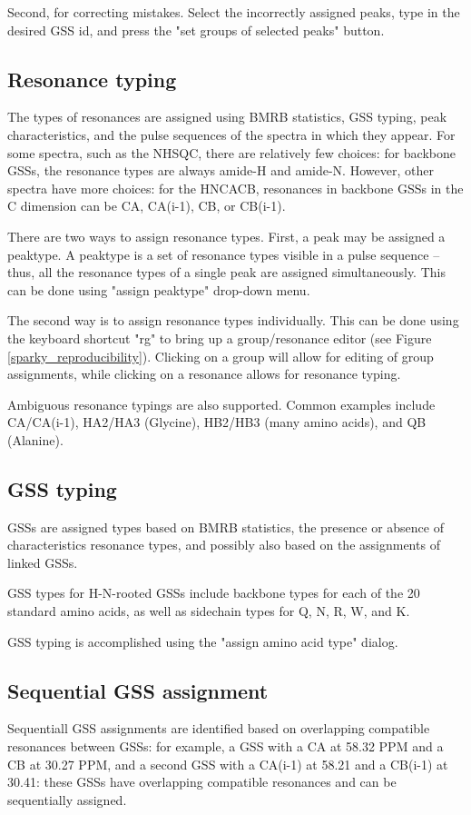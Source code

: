 Second, for correcting mistakes.  Select the incorrectly assigned peaks,
type in the desired GSS id, and press the "set groups of selected peaks" button.

\subsection{Resonance typing}
The types of resonances are assigned using BMRB statistics, GSS typing, 
peak characteristics,
and the pulse sequences of the spectra in which they appear.  For some spectra,
such as the NHSQC, there are relatively few choices: for backbone GSSs,
the resonance types are always amide-H and amide-N.  However, other spectra
have more choices: for the HNCACB, resonances in backbone GSSs in the C
dimension can be CA, CA(i-1), CB, or CB(i-1).

There are two ways to assign resonance types.  First, a peak may be assigned
a peaktype.  A peaktype is a set of resonance types visible in a pulse sequence
-- thus, all the resonance types of a single peak are assigned simultaneously.
This can be done using "assign peaktype" drop-down menu.

The second way is to assign resonance types individually.  This can be done 
using the keyboard shortcut "rg" to bring up a group/resonance editor
(see Figure \ref{sparky_reproducibility}).  Clicking on a group will allow
for editing of group assignments, while clicking on a resonance allows for
resonance typing.

Ambiguous resonance typings are also supported.  Common examples include
CA/CA(i-1), HA2/HA3 (Glycine), HB2/HB3 (many amino acids), and QB (Alanine).

\subsection{GSS typing}
GSSs are assigned types based on BMRB statistics, the presence or absence of
characteristics resonance types, and possibly also based on the assignments 
of linked GSSs.

GSS types for H-N-rooted GSSs include backbone types for each of the 20 
standard amino acids, as well as sidechain types for Q, N, R, W, and K.

GSS typing is accomplished using the "assign amino acid type" dialog.

\subsection{Sequential GSS assignment}
Sequentiall GSS assignments are identified based on overlapping compatible
resonances between GSSs: for example, a GSS with a CA at 58.32 PPM and a CB
at 30.27 PPM, and a second GSS with a CA(i-1) at 58.21 and a CB(i-1) at 30.41:
these GSSs have overlapping compatible resonances and can be sequentially
assigned.

